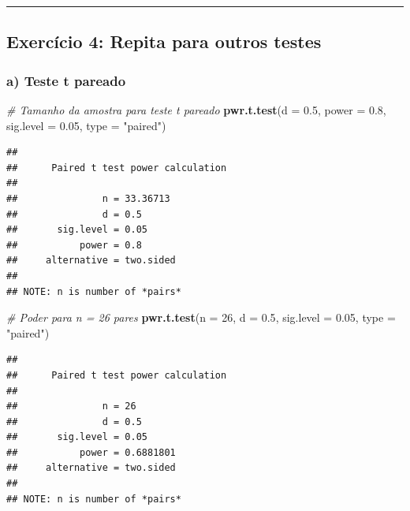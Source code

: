 \documentclass[
]{book}
\newenvironment{Shaded}{\begin{snugshade}}{\end{snugshade}}
\newcommand{\AttributeTok}[1]{\textcolor[rgb]{0.13,0.29,0.53}{#1}}
\newcommand{\CommentTok}[1]{\textcolor[rgb]{0.56,0.35,0.01}{\textit{#1}}}
\newcommand{\DecValTok}[1]{\textcolor[rgb]{0.00,0.00,0.81}{#1}}
\newcommand{\FloatTok}[1]{\textcolor[rgb]{0.00,0.00,0.81}{#1}}
\newcommand{\FunctionTok}[1]{\textcolor[rgb]{0.13,0.29,0.53}{\textbf{#1}}}
\newcommand{\NormalTok}[1]{#1}
\newcommand{\StringTok}[1]{\textcolor[rgb]{0.31,0.60,0.02}{#1}}
\begin{document}
\begin{center}\rule{0.5\linewidth}{0.5pt}\end{center}

\subsection{Exercício 4: Repita para outros testes}\label{exercuxedcio-4-repita-para-outros-testes}

\subsubsection{a) Teste t pareado}\label{a-teste-t-pareado}

\begin{Shaded}
\begin{Highlighting}[]
\CommentTok{\# Tamanho da amostra para teste t pareado}
\FunctionTok{pwr.t.test}\NormalTok{(}\AttributeTok{d =} \FloatTok{0.5}\NormalTok{, }\AttributeTok{power =} \FloatTok{0.8}\NormalTok{, }\AttributeTok{sig.level =} \FloatTok{0.05}\NormalTok{, }\AttributeTok{type =} \StringTok{"paired"}\NormalTok{)}
\end{Highlighting}
\end{Shaded}

\begin{verbatim}
## 
##      Paired t test power calculation 
## 
##               n = 33.36713
##               d = 0.5
##       sig.level = 0.05
##           power = 0.8
##     alternative = two.sided
## 
## NOTE: n is number of *pairs*
\end{verbatim}

\begin{Shaded}
\begin{Highlighting}[]
\CommentTok{\# Poder para n = 26 pares}
\FunctionTok{pwr.t.test}\NormalTok{(}\AttributeTok{n =} \DecValTok{26}\NormalTok{, }\AttributeTok{d =} \FloatTok{0.5}\NormalTok{, }\AttributeTok{sig.level =} \FloatTok{0.05}\NormalTok{, }\AttributeTok{type =} \StringTok{"paired"}\NormalTok{)}
\end{Highlighting}
\end{Shaded}

\begin{verbatim}
## 
##      Paired t test power calculation 
## 
##               n = 26
##               d = 0.5
##       sig.level = 0.05
##           power = 0.6881801
##     alternative = two.sided
## 
## NOTE: n is number of *pairs*
\end{verbatim}
\end{document}
